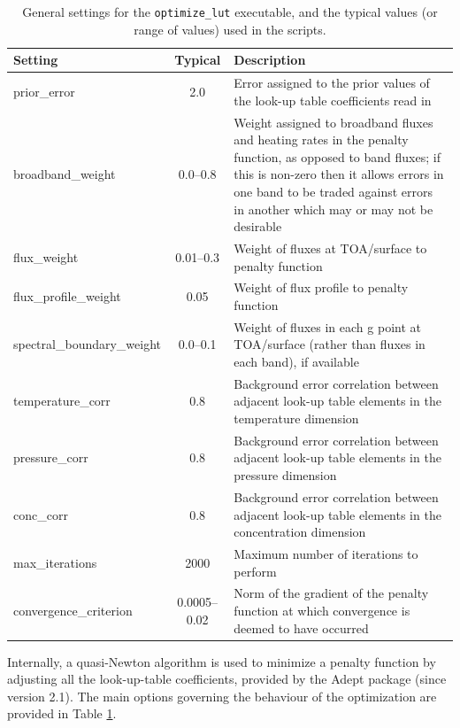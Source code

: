 \documentclass[a4,oneside]{article}
\def\codesize{\small}
\def\codesize{\small}
\def\code#1{{\codesize\texttt{#1}}}
\begin{document}
\begin{table}[tb!]
\caption{\label{tab:optimize}General settings for the
  \code{optimize\_lut} executable, and the typical values (or range of
  values) used in the scripts.}
\begin{center}
\begin{tabular}{lc>{\raggedright\arraybackslash}p{9cm}}
\hline
Setting & Typical & Description\\
\hline
prior\_error & 2.0 & Error assigned to the prior values of the look-up table coefficients read in \\
broadband\_weight & 0.0--0.8 & Weight assigned to broadband fluxes and heating rates in the penalty function, as opposed to band fluxes; if this is non-zero then it allows errors in one band to be traded against errors in another which may or may not be desirable\\
flux\_weight & 0.01--0.3 & Weight of fluxes at TOA/surface to penalty function\\
flux\_profile\_weight & 0.05 & Weight of flux profile to penalty function \\
spectral\_boundary\_weight & 0.0--0.1 & Weight of fluxes in each g point at TOA/surface (rather than fluxes in each band), if available\\
temperature\_corr & 0.8 & Background error correlation between adjacent look-up table elements in the temperature dimension\\
pressure\_corr & 0.8  & Background error correlation between adjacent look-up table elements in the pressure dimension\\
conc\_corr & 0.8  & Background error correlation between adjacent look-up table elements in the concentration dimension\\
max\_iterations & 2000 & Maximum number of iterations to perform \\
convergence\_criterion & 0.0005--0.02 & Norm of the gradient of the penalty function at which convergence is deemed to have occurred \\
\hline
\end{tabular}
\end{center}
\end{table}

Internally, a quasi-Newton algorithm is used to minimize a penalty
function by adjusting all the look-up-table coefficients, provided by
the Adept package (since version 2.1). The main options governing the
behaviour of the optimization are provided in Table
\ref{tab:optimize}.
\end{document}
